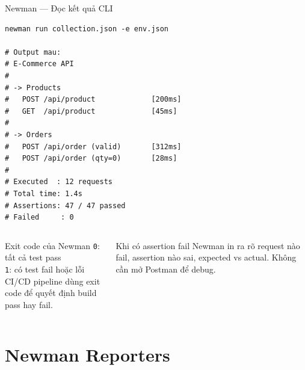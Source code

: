 \documentclass[aspectratio=169,10pt]{beamer}
\begin{document}
\begin{frame}[fragile]{Newman --- Đọc kết quả CLI}
\begin{lstlisting}[style=bash]
newman run collection.json -e env.json

# Output mau:
# E-Commerce API
#
# -> Products
#   POST /api/product             [200ms]
#   GET  /api/product             [45ms]
#
# -> Orders
#   POST /api/order (valid)       [312ms]
#   POST /api/order (qty=0)       [28ms]
#
# Executed  : 12 requests
# Total time: 1.4s
# Assertions: 47 / 47 passed
# Failed     : 0
\end{lstlisting}

  \begin{columns}
    \begin{block}{Exit code của Newman}
      \texttt{0}: tất cả test pass\\
      \texttt{1}: có test fail hoặc lỗi\\[0.3em]
      CI/CD pipeline dùng exit code để quyết định
      build pass hay fail.
    \end{block}

    \begin{alertblock}{Khi có assertion fail}
      Newman in ra rõ request nào fail,
      assertion nào sai, expected vs actual.
      Không cần mở Postman để debug.
    \end{alertblock}
  \end{columns}
\end{frame}

\section{Newman Reporters}
\end{document}
